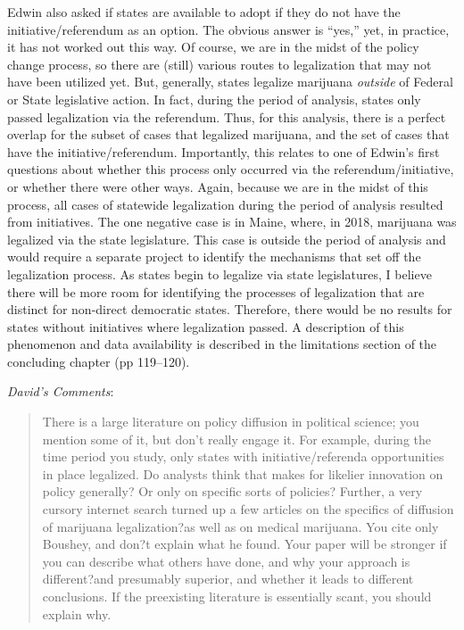 \documentclass[12pt,stdletter,dateno,sigleft]{newlfm} %
\begin{document}
\begin{newlfm}
Edwin also asked if states are available to adopt if they do not have the initiative/referendum as an option. The obvious answer is ``yes,'' yet, in practice, it has not worked out this way. Of course, we are in the midst of the policy change process, so there are (still) various routes to legalization that may not have been utilized yet. But, generally, states legalize marijuana \textit{outside} of Federal or State legislative action. In fact, during the period of analysis, states only passed legalization via the referendum. Thus, for this analysis, there is a perfect overlap for the subset of cases that legalized marijuana, and the set of cases that have the initiative/referendum. Importantly, this relates to one of Edwin's first questions about whether this process only occurred via the referendum/initiative, or whether there were other ways. Again, because we are in the midst of this process, all cases of statewide legalization during the period of analysis resulted from initiatives. The one negative case is in Maine, where, in 2018, marijuana was legalized via the state legislature. This case is outside the period of analysis and would require a separate project to identify the mechanisms that set off the legalization process. As states begin to legalize via state legislatures, I believe there will be more room for identifying the processes of legalization that are distinct for non-direct democratic states. Therefore, there would be no results for states without initiatives where legalization passed. A description of this phenomenon and data availability is described in the limitations section of the concluding chapter (pp 119--120).\newline


\textit{David's Comments}:

\begin{quotation}{\color{red}\noindent \footnotesize
There is a large literature on policy diffusion in political science; you mention some of it, but don't really engage it. For example, during the time period you study, only states with initiative/referenda opportunities in place legalized. Do analysts think that makes for likelier innovation on policy generally? Or only on specific sorts of policies? Further, a very cursory internet search turned up a few articles on the specifics of diffusion of marijuana legalization?as well as on medical marijuana. You cite only Boushey, and don?t explain what he found. Your paper will be stronger if you can describe what others have done, and why your approach is different?and presumably superior, and whether it leads to different conclusions. If the preexisting literature is essentially scant, you should explain why.
}
\end{quotation}


\end{newlfm}
\end{document}
